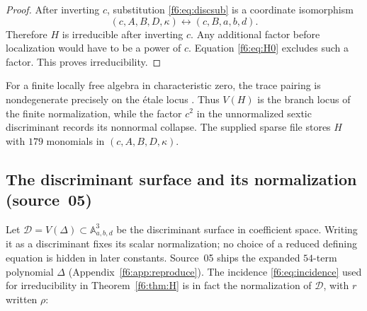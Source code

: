 \documentclass[11pt,a4paper]{article}
\theoremstyle{definition}
\newcommand{\A}{\mathbb A}
\newcommand{\kk}{\kappa}
\newcommand{\dd}{\mathcal D}
\newcommand{\src}[1]{\textup{(source~#1)}}
\begin{document}
\begin{proof}
After inverting $c$, substitution \eqref{f6:eq:discsub} is a coordinate
isomorphism
\[
 (c,A,B,D,\kk)\longleftrightarrow(c,B,a,b,d).
\]
Therefore $H$ is irreducible after inverting $c$. Any additional factor
before localization would have to be a power of $c$. Equation
\eqref{f6:eq:H0} excludes such a factor. This proves irreducibility.
\end{proof}

For a finite locally free algebra in characteristic zero, the trace
pairing is nondegenerate precisely on the \'etale locus
\cite[Tag 0BJF]{StacksDisc}. Thus $V(H)$ is the branch locus of the
finite normalization, while the factor $c^2$ in the unnormalized sextic
discriminant records its nonnormal collapse. The supplied sparse file
stores $H$ with $179$ monomials in $(c,A,B,D,\kk)$.

\subsection{The discriminant surface and its normalization \src{05}}
Let $\dd=V(\Delta)\subset\A^3_{a,b,d}$ be the discriminant surface in
coefficient space. Writing it as a discriminant fixes its scalar
normalization; no choice of a reduced defining equation is hidden in later
constants. Source~05 ships the expanded $54$-term polynomial $\Delta$
(Appendix~\ref{f6:app:reproduce}). The incidence \eqref{f6:eq:incidence}
used for irreducibility in Theorem~\ref{f6:thm:H} is in fact the
normalization of $\dd$, with $r$ written $\rho$:
\end{document}
